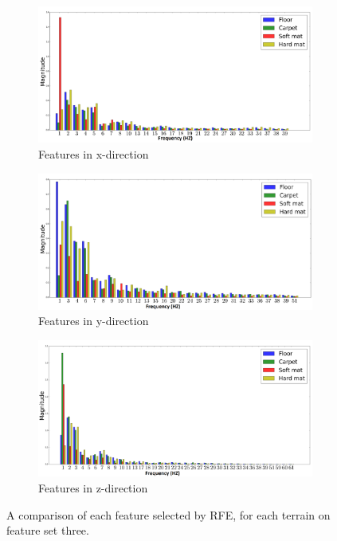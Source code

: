 \documentclass[USenglish]{ifimaster}  %
\begin{document}
\begin{figure} [h]
	\centering
	\begin{subfigure}[b]{\textwidth}
		\includegraphics[width=\textwidth,height=\textheight,keepaspectratio]{Figures/featureselx2}
		\caption{Features in x-direction}
		\label{fig:featurex} 
	\end{subfigure}
	
	\begin{subfigure}[b]{\textwidth}
		\includegraphics[width=\textwidth,height=\textheight,keepaspectratio]{Figures/featuresely2}
		\caption{Features in y-direction}
		\label{fig:featurey}
	\end{subfigure}
	
	\begin{subfigure}[h]{\textwidth}
		\includegraphics[width=\textwidth,height=\textheight,keepaspectratio]{Figures/featureselz2}
		\caption{Features in z-direction}
		\label{fig:featurez}
	\end{subfigure}

	\caption[Comparison of each feature on different terrains selected from RFE]{A comparison of each feature selected by RFE, for each terrain on feature set three.}
	\label{fig:wrapperset5}
\end{figure}
\FloatBarrier
\end{document}
